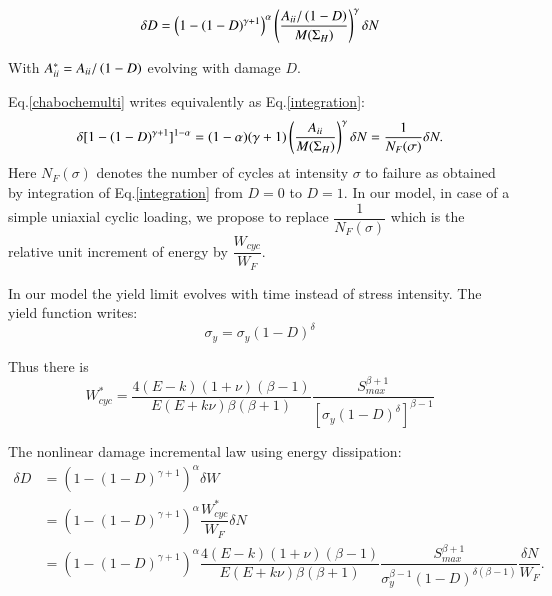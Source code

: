 \documentclass[3p,times,number,review]{elsarticle}
\begin{document}
 \begin{equation}\delta D = \left( 1 -(1-D)^{\gamma+1}\right)^\alpha \left(\frac{{A}_{\uppercase\expandafter{\romannumeral2}}/\left( 1-D\right) }{M(\Sigma_H)}\right)^\gamma \delta N
 \label{chabochemulti}
 \end{equation} 
 
With ${A}_{\uppercase\expandafter{\romannumeral2}}^*={A}_{\uppercase\expandafter{\romannumeral2}}/\left( 1-D\right) $ evolving with damage $D$. 
 
Eq.\eqref{chabochemulti} writes equivalently as Eq.\eqref{integration}:
   \begin{equation}\delta [1-(1-D)^{\gamma+1}]^{1-\alpha}=(1-\alpha)(\gamma+1)\left(\dfrac{{A}_{\uppercase\expandafter{\romannumeral2}} }{M(\Sigma_H)}\right)^\gamma \delta N=\dfrac{1}{N_F(\sigma)}\delta N.
   \label{integration}
   \end{equation}
Here $N_F(\sigma)$ denotes the number of cycles at intensity $\sigma$ to failure as obtained by integration of Eq.\eqref{integration} from $D=0$ to $D=1$. In our model, in case of a simple uniaxial cyclic loading, we propose to replace $\dfrac{1}{N_F(\sigma)}$ which is the relative unit increment of energy by $\dfrac{W_{cyc}}{W_F}$.

In our model the yield limit evolves with time instead of stress intensity. The yield function writes:
\begin{equation}\sigma_y=\sigma_y\left(1-D \right)^\delta
\label{yield}
\end{equation} 

Thus there is
\begin{equation}
W_{cyc}^*=\dfrac{4(E-k)(1+\nu)\left( \beta-1\right) }{ E(E+k\nu)\beta\left( \beta+1\right) }\dfrac{S_{max}^{\beta+1}}{ \left[  \sigma_y\left(1-D\right)^{\delta}\right] ^{\beta-1}}
\end{equation} 

The nonlinear damage incremental law using energy dissipation:
\begin{equation}
\begin{split}
  \delta D &=\left( 1 -(1-D)^{\gamma+1}\right)^\alpha \delta W
  \\&= \left( 1 -(1-D)^{\gamma+1}\right)^\alpha \dfrac{W_{cyc}^*}{W_F}\delta N
  \\&= \left( 1 -(1-D)^{\gamma+1}\right)^\alpha \dfrac{4(E-k)(1+\nu)\left( \beta-1\right) }{ E(E+k\nu)\beta\left( \beta+1\right) }\dfrac{S_{max}^{\beta+1}}{ \sigma_y^{\beta-1}\left(1-D\right)^{\delta(\beta-1)}}\dfrac{\delta N}{W_F}.
\end{split}
\label{recoverchaboche}
\end{equation} 
\end{document}
